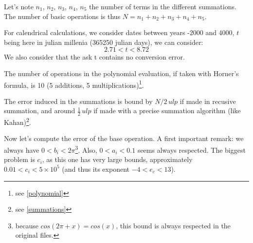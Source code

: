 Let's note $n_1$, $n_2$, $n_3$, $n_4$, $n_5$ the number of terms in the different summations. The number of basic operations is thus $N=n_1+n_2+n_3+n_4+n_5$. 

For calendrical calculations, we consider dates between years -2000 and 4000, $t$ being here in julian millenia (\num{365250} julian days), we can consider: $$2.71 < t < 8.72$$ We also consider that the ask t contains no conversion error.

The number of operations in the polynomial evaluation, if taken with Horner's formula, is 10 (5 additions, 5 multiplications)\footnote{see \ref{polynomial}}. 

The error induced in the summations is bound by $N/2\,ulp$ if made in recusive summation, and around $\frac{1}{2}\,ulp$ if made with a precise summation algorithm (like Kahan)\footnote{see \ref{summations}}.

Now let's compute the error of the base operation. A first important remark: we always have $0<b_i<2\pi$\footnote{because $cos(2\pi+x)=cos(x)$, this bound is always respected in the original files.}. Also, $0<a_i<0.1$ seems always respected. The biggest problem is $c_i$, as this one has very large bounds, approximately $0.01<c_i<5\times10^5$ (and thus its exponent $-4<e_c<13$).

